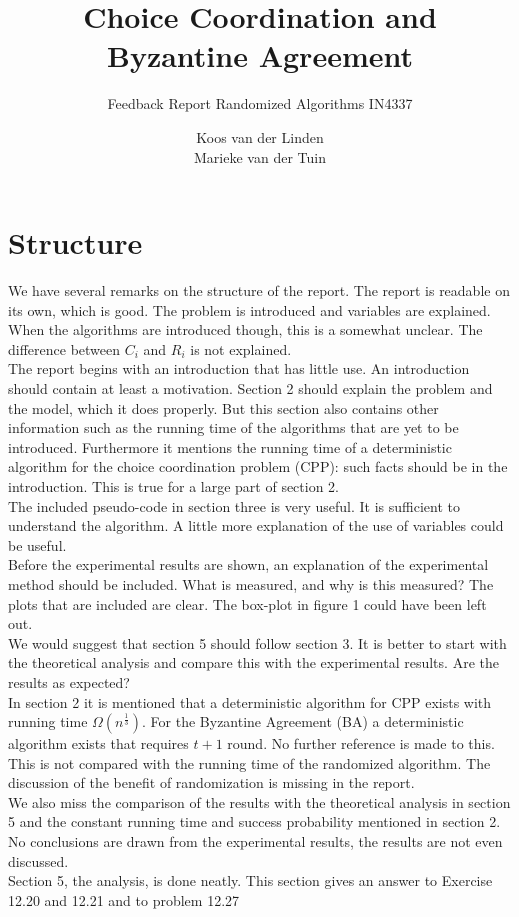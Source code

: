 \documentclass[nocopyrightspace]{acm_proc_article-sp}
\begin{document}
\title{Choice Coordination and Byzantine Agreement}
\subtitle{Feedback Report Randomized Algorithms IN4337}
\author{
\alignauthor
Koos van der Linden \\ 
\alignauthor
Marieke van der Tuin \\ 
}
\maketitle
\section{Structure}
We have several remarks on the structure of the report. The report is readable on its own, which is good. The problem is introduced and variables are explained. When the algorithms are introduced though, this is a somewhat unclear. The difference between $C_i$ and $R_i$ is not explained.\\
The report begins with an introduction that has little use. An introduction should contain at least a motivation. Section 2 should explain the problem and the model, which it does properly. But this section also contains other information such as the running time of the algorithms that are yet to be introduced. Furthermore it mentions the running time of a deterministic algorithm for the choice coordination problem (CPP): such facts should be in the introduction. This is true for a large part of section 2. \\ 
The included pseudo-code in section three is very useful. It is sufficient to understand the algorithm. A little more explanation of the use of variables could be useful. \\
Before the experimental results are shown, an explanation of the experimental method should be included. What is measured, and why is this measured? The plots that are included are clear. The box-plot in figure 1 could have been left out. \\
We would suggest that section 5 should follow section 3. It is better to start with the theoretical analysis and compare this with the experimental results. Are the results as expected?\\
In section 2 it is mentioned that  a deterministic algorithm for CPP exists with running time $\Omega(n^\frac{1}{3})$. For the Byzantine Agreement (BA) a deterministic algorithm exists that requires $t+1$ round. No further reference is made to this. This is not compared with the running time of the randomized algorithm. The discussion of the benefit of randomization is missing in the report. \\
We also miss the comparison of the results with the theoretical analysis in section 5 and the constant running time and success probability mentioned in section 2. No conclusions are drawn from the experimental results, the results are not even discussed. \\
Section 5, the analysis, is done neatly. This section gives an answer to Exercise 12.20 and 12.21 and to problem 12.27
\end{document}
